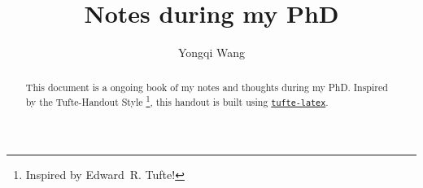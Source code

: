 \documentclass{tufte-handout}
\title{Notes during my PhD}
\author{Yongqi Wang}
\begin{document}
\maketitle%

\begin{abstract}
\noindent
This document is a ongoing book of my notes and thoughts during my PhD.
Inspired by the Tufte-Handout Style \thanks{Inspired by Edward~R. Tufte!}, this handout is built
using \href{https://github.com/Tufte-LaTeX/tufte-latex}{\texttt{tufte-latex}}.
\end{abstract}






\end{document}
